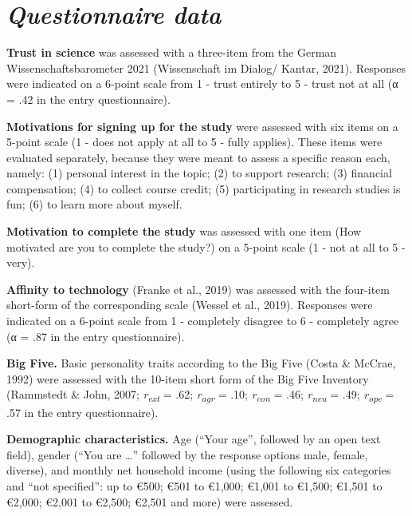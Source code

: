 \documentclass[authordate, empirical]{jote-new-article}
\begin{document}
	\section{\emph{\textbf{Questionnaire data}}}



	\textbf{Trust in science} was assessed with a three-item from the German Wissenschaftsbarometer 2021 (Wissenschaft im Dialog/ Kantar, 2021). Responses were indicated on a 6-point scale from 1 - trust entirely to 5 - trust not at all (α = .42 in the entry questionnaire).



	\textbf{Motivations for signing up for the study }were assessed with six items on a 5-point scale (1 - does not apply at all to 5 - fully applies). These items were evaluated separately, because they were meant to assess a specific reason each, namely: (1) personal interest in the topic; (2) to support research; (3) financial compensation; (4) to collect course credit; (5) participating in research studies is fun; (6) to learn more about myself.



	\textbf{Motivation to complete the study }was assessed with one item (How motivated are you to complete the study?) on a 5-point scale (1 - not at all to 5 - very).



	\textbf{Affinity to technology} (Franke et al., 2019) was assessed with the four-item short-form of the corresponding scale (Wessel et al., 2019). Responses were indicated on a 6-point scale from 1 - completely disagree to 6 - completely agree (α = .87 in the entry questionnaire).



	\textbf{Big Five. }Basic personality traits according to the Big Five (Costa \& McCrae, 1992) were assessed with the 10-item short form of the Big Five Inventory (Rammstedt \& John, 2007;\emph{ r}\textsubscript{\emph{ext}} = .62;\emph{ r}\textsubscript{\emph{agr}} = .10; \emph{r}\textsubscript{\emph{con}} = .46;\emph{ r}\textsubscript{\emph{neu}} = .49;\emph{ r}\textsubscript{\emph{ope}} = .57 in the entry questionnaire).



	\textbf{Demographic characteristics.} Age (“Your age”, followed by an open text field), gender (“You are …” followed by the response options male, female, diverse), and monthly net household income (using the following six categories and “not specified”: up to €500; €501 to €1,000; €1,001 to €1,500; €1,501 to €2,000; €2,001 to €2,500; €2,501 and more) were assessed.
\end{document}
